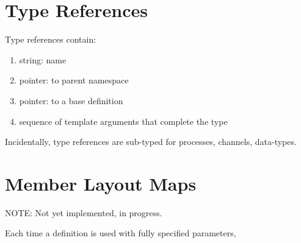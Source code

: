\section{Type References}
\label{sec:definition:typeref}

Type references contain:

\begin{enumerate}
\item string: name
\item pointer: to parent namespace
\item pointer: to a base definition
\item sequence of template arguments that complete the type
\end{enumerate}

Incidentally, type references are sub-typed for 
processes, channels, data-types.  

\section{Member Layout Maps}
\label{sec:definition:layout}

NOTE: Not yet implemented, in progress.  

Each time a definition is used with fully specified parameters, 



